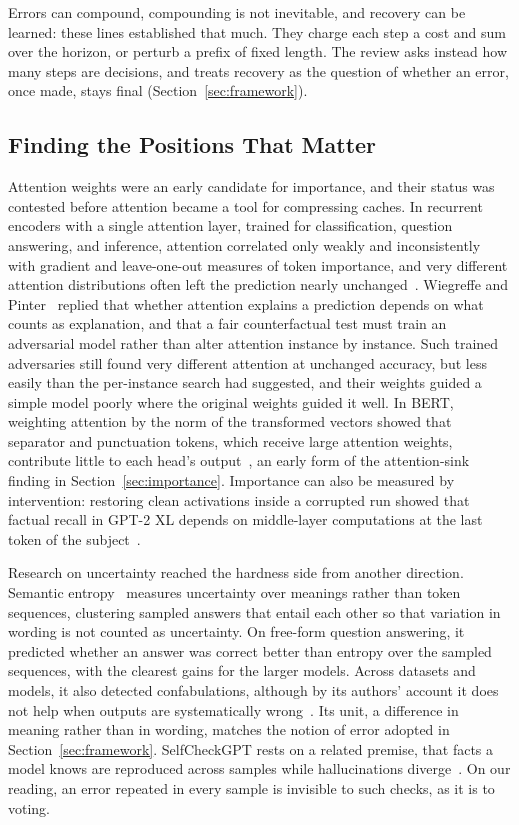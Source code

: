\documentclass{ieeeaccess}
\begin{document}
Errors can compound, compounding is not inevitable, and recovery can be learned: these lines established that much. They charge each step a cost and sum over the horizon, or perturb a prefix of fixed length. The review asks instead how many steps are decisions, and treats recovery as the question of whether an error, once made, stays final (Section~\ref{sec:framework}).

\subsection{Finding the Positions That Matter}
Attention weights were an early candidate for importance, and their status was contested before attention became a tool for compressing caches. In recurrent encoders with a single attention layer, trained for classification, question answering, and inference, attention correlated only weakly and inconsistently with gradient and leave-one-out measures of token importance, and very different attention distributions often left the prediction nearly unchanged~\cite{jain2019attention}. Wiegreffe and Pinter~\cite{wiegreffe2019attention} replied that whether attention explains a prediction depends on what counts as explanation, and that a fair counterfactual test must train an adversarial model rather than alter attention instance by instance. Such trained adversaries still found very different attention at unchanged accuracy, but less easily than the per-instance search had suggested, and their weights guided a simple model poorly where the original weights guided it well. In BERT, weighting attention by the norm of the transformed vectors showed that separator and punctuation tokens, which receive large attention weights, contribute little to each head's output~\cite{kobayashi2020attention}, an early form of the attention-sink finding in Section~\ref{sec:importance}. Importance can also be measured by intervention: restoring clean activations inside a corrupted run showed that factual recall in GPT-2 XL depends on middle-layer computations at the last token of the subject~\cite{meng2022locating}.

Research on uncertainty reached the hardness side from another direction. Semantic entropy~\cite{kuhn2023semantic} measures uncertainty over meanings rather than token sequences, clustering sampled answers that entail each other so that variation in wording is not counted as uncertainty. On free-form question answering, it predicted whether an answer was correct better than entropy over the sampled sequences, with the clearest gains for the larger models. Across datasets and models, it also detected confabulations, although by its authors' account it does not help when outputs are systematically wrong~\cite{farquhar2024detecting}. Its unit, a difference in meaning rather than in wording, matches the notion of error adopted in Section~\ref{sec:framework}. SelfCheckGPT rests on a related premise, that facts a model knows are reproduced across samples while hallucinations diverge~\cite{manakul2023selfcheckgpt}. On our reading, an error repeated in every sample is invisible to such checks, as it is to voting.
\end{document}
